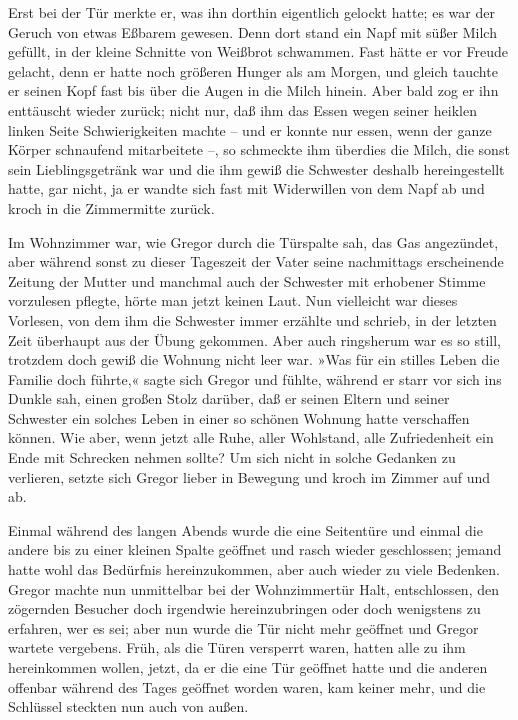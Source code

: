 Erst bei der Tür merkte er, was ihn dorthin eigentlich gelockt hatte; es
war der Geruch von etwas Eßbarem gewesen. Denn dort stand ein Napf mit
süßer Milch gefüllt, in der kleine Schnitte von Weißbrot schwammen. Fast
hätte er vor Freude gelacht, denn er hatte noch größeren Hunger als am
Morgen, und gleich tauchte er seinen Kopf fast bis über die Augen in die
Milch hinein. Aber bald zog er ihn enttäuscht wieder zurück; nicht nur,
daß ihm das Essen wegen seiner heiklen linken Seite Schwierigkeiten
machte -- und er konnte nur essen, wenn der ganze Körper schnaufend
mitarbeitete --, so schmeckte ihm überdies die Milch, die sonst sein
Lieblingsgetränk war und die ihm gewiß die Schwester deshalb
hereingestellt hatte, gar nicht, ja er wandte sich fast mit Widerwillen
von dem Napf ab und kroch in die Zimmermitte zurück.

Im Wohnzimmer war, wie Gregor durch die Türspalte sah, das Gas
angezündet, aber während sonst zu dieser Tageszeit der Vater seine
nachmittags erscheinende Zeitung der Mutter und manchmal auch der
Schwester mit erhobener Stimme vorzulesen pflegte, hörte man jetzt
keinen Laut. Nun vielleicht war dieses Vorlesen, von dem ihm die
Schwester immer erzählte und schrieb, in der letzten Zeit überhaupt aus
der Übung gekommen. Aber auch ringsherum war es so still, trotzdem doch
gewiß die Wohnung nicht leer war. »Was für ein stilles Leben die Familie
doch führte,« sagte sich Gregor und fühlte, während er starr vor sich
ins Dunkle sah, einen großen Stolz darüber, daß er seinen Eltern und
seiner Schwester ein solches Leben in einer so schönen Wohnung hatte
verschaffen können. Wie aber, wenn jetzt alle Ruhe, aller Wohlstand,
alle Zufriedenheit ein Ende mit Schrecken nehmen sollte? Um sich nicht
in solche Gedanken zu verlieren, setzte sich Gregor lieber in Bewegung
und kroch im Zimmer auf und ab.

Einmal während des langen Abends wurde die eine Seitentüre und einmal
die andere bis zu einer kleinen Spalte geöffnet und rasch wieder
geschlossen; jemand hatte wohl das Bedürfnis hereinzukommen, aber auch
wieder zu viele Bedenken. Gregor machte nun unmittelbar bei der
Wohnzimmertür Halt, entschlossen, den zögernden Besucher doch irgendwie
hereinzubringen oder doch wenigstens zu erfahren, wer es sei; aber nun
wurde die Tür nicht mehr geöffnet und Gregor wartete vergebens. Früh,
als die Türen versperrt waren, hatten alle zu ihm hereinkommen wollen,
jetzt, da er die eine Tür geöffnet hatte und die anderen offenbar
während des Tages geöffnet worden waren, kam keiner mehr, und die
Schlüssel steckten nun auch von außen.

